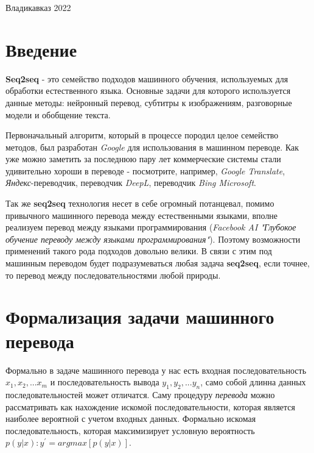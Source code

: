 \documentclass[a4paper,14pt]{article}
\begin{document}
	\normalsize{ \hspace{28pt}} \hfill \break
	\begin{center} Владикавказ 2022 \end{center}
	
	\thispagestyle{empty}
	\tableofcontents
	\thispagestyle{empty}
	\clearpage
	\newtheorem{theorem}{Теорема}
	
	\section{Введение}
	
	 \textbf{Seq2seq} - это семейство подходов машинного обучения, используемых для обработки естественного языка. Основные задачи для которого используется данные методы: нейронный перевод, субтитры к изображениям, разговорные модели и обобщение текста.
	 
	 Первоначальный алгоритм, который в процессе породил целое семейство методов, был разработан \textit{Google} для использования в машинном переводе. Как уже можно заметить за последнюю пару лет коммерческие системы стали удивительно хороши в  переводе - посмотрите, например, \textit{Google Translate}, \textit{Яндекс}-переводчик, переводчик \textit{DeepL}, переводчик \textit{Bing Microsoft}.
	 
	 Так же \textbf{seq2seq} технология несет в себе огромный потанцевал, помимо привычного машинного перевода между естественными языками, вполне реализуем перевод между языками программирования (\textit{Facebook AI "Глубокое обучение переводу между языками программирования"}). Поэтому возможности применений такого рода подходов довольно велики. В связи с этим под машинным переводом будет подразумеваться любая задача \textbf{seq2seq}, если точнее, то перевод между последовательностями любой природы.
	 
	 \clearpage
	 
	 \section{Формализация задачи машинного перевода}
	 Формально в задаче машинного перевода у нас есть входная последовательность $x_{1}, x_{2}, ... x_{m}$ и последовательность вывода $y_{1}, y_{2}, ... y_{n}$, само собой длинна данных последовательностей может отличатся. Саму процедуру \textit{перевода} можно рассматривать как нахождение искомой последовательности, которая является наиболее вероятной с учетом входных данных. Формально искомая последовательность, которая максимизирует условную вероятность $p(y|x): y^{'} = argmax[p(y|x)]$.
	 
\end{document}
